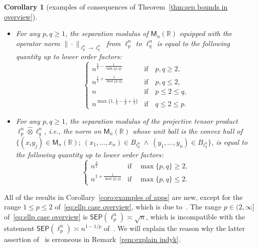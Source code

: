 \documentclass[11pt,reqno]{amsart}
\renewcommand{\le}{\leqslant}
\renewcommand{\ge}{\geqslant}
\newcommand{\R}{\mathbb R}
\newtheorem{corollary}[theorem]{Corollary}
\theoremstyle{remark}
\newcommand{\M}{\mathsf{M}}
\renewcommand{\1}{\mathbf 1}
\newcommand{\sep}{\mathsf{SEP}}
\newcommand{\tp}{\hat{\otimes}}
\begin{document}
\begin{corollary}[examples of consequences of Theorem~\ref{thm:sep bounds in overview}]
\begin{itemize}
\begin{equation}
\end{equation}
\item For any $p,q\ge 1$, the separation modulus of $\M_n(\R)$ equipped with the operator norm $\|\cdot\|_{\ell_p^n\to \ell_q^n}$ from $\ell_p^n$ to $\ell_q^n$ is equal to the following quantity up to lower order factors:
    $$
     \left\{ \begin{array}{ll}
n^{\frac32-\frac{1}{\min\{p,q\}}} &\mathrm{if}\quad  p,q\ge 2,\\
n^{\frac12+\frac{1}{\max\{p,q\}}} &\mathrm{if}\quad  p,q\le 2,\\
n& \mathrm{if}\quad  p\le 2\le q,\\
n^{\max\big\{1,\frac{1}{q}-\frac{1}{p}+\frac12\big\}} &\mathrm{if}\quad  q\le 2\le p.
  \end{array} \right.
    $$
    \item For any $p,q\ge 1$, the separation modulus of the projective tensor product $\ell_p^n\tp \ell_q^n$, i.e., the norm on $\M_n(\R)$ whose unit ball  is the convex hull of  $\{(x_iy_j)\in \M_n(\R);\ (x_1,\ldots, x_n)\in B_{\ell_p^n}\ \wedge \ (y_1,\ldots, y_n)\in B_{\ell_q^n}\}$, is equal to the following quantity up to lower order factors:
$$
\left\{ \begin{array}{ll} n^{\frac32} &\mathrm{if}\quad  \max\{p,q\}\ge 2,\\ n^{1+\frac{1}{\max\{p,q\}}} & \mathrm{if}\quad  \max\{p,q\}\le 2.
  \end{array} \right.
$$
\end{itemize}
\end{corollary}
All of the results in Corollary~\ref{coro:examples of apps} are new, except for the range $1\le p\le 2$ of~\eqref{eq:ellp case overview}, which is due to~\cite{CCGGP98}.  The range $p\in (2,\infty]$ of~\eqref{eq:ellp case overview} is $\sep(\ell_p^n)\asymp \sqrt{n}$, which is incompatible with the statement $\sep(\ell_p^n)\asymp n^{1-1/p}$ of~\cite{CCGGP98}. We will explain the reason why the latter assertion of~\cite{CCGGP98}  is erroneous in Remark~\ref{rem:explain indyk}.
\end{document}
